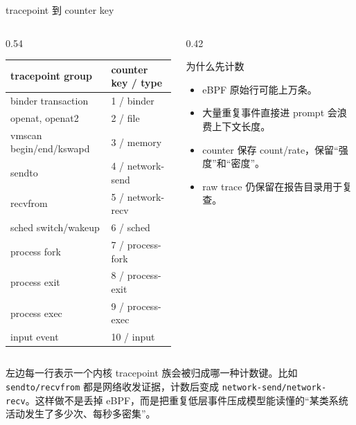 \documentclass[UTF8,aspectratio=169,10pt]{ctexbeamer}
\newcommand{\code}[1]{\texttt{\small #1}}
\newcommand{\explainfoot}[1]{%
  \vspace{0.35em}
  {\scriptsize\color{memoGray}#1}
}
\begin{document}
\begin{frame}{tracepoint 到 counter key}
  \small
  \begin{columns}[T,totalwidth=\textwidth]
    \begin{column}{0.54\textwidth}
      \begin{tabular}{ll}
        \toprule
        tracepoint group & counter key / type \\
        \midrule
        binder transaction & 1 / binder \\
        openat, openat2 & 2 / file \\
        vmscan begin/end/kswapd & 3 / memory \\
        sendto & 4 / network-send \\
        recvfrom & 5 / network-recv \\
        sched switch/wakeup & 6 / sched \\
        process fork & 7 / process-fork \\
        process exit & 8 / process-exit \\
        process exec & 9 / process-exec \\
        input event & 10 / input \\
        \bottomrule
      \end{tabular}
    \end{column}
    \begin{column}{0.42\textwidth}
      \begin{block}{为什么先计数}
        \begin{itemize}
          \item eBPF 原始行可能上万条。
          \item 大量重复事件直接进 prompt 会浪费上下文长度。
          \item counter 保存 count/rate，保留“强度”和“密度”。
          \item raw trace 仍保留在报告目录用于复查。
        \end{itemize}
      \end{block}
    \end{column}
  \end{columns}
  \explainfoot{左边每一行表示一个内核 tracepoint 族会被归成哪一种计数键。比如 \code{sendto/recvfrom} 都是网络收发证据，计数后变成 \code{network-send/network-recv}。这样做不是丢掉 eBPF，而是把重复低层事件压成模型能读懂的“某类系统活动发生了多少次、每秒多密集”。}
\end{frame}
\end{document}
